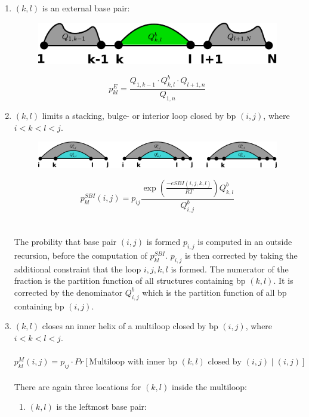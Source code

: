 \documentclass[11pt,a4paper]{report}
\begin{document}
\begin{enumerate}
\item $(k, l)$ is an external base pair:
\begin{figure}[H]
\centering
\includegraphics[scale=1]{BPP1.pdf}
\end{figure}
\begin{equation*}
p_{kl}^E = \frac{Q_{1,k-1} \cdot Q_{k,l}^b \cdot Q_{l+1,n}}{Q_{1,n}}
\end{equation*}
\item $(k, l)$ limits a stacking, bulge- or interior loop closed by bp $(i,j)$, where $i < k < l < j$.
\begin{figure}[H]
\centering
\includegraphics[scale=0.6]{BPP2.pdf}
\end{figure}
\begin{equation*}
p_{kl}^{SBI} (i,j) = p_{ij} \frac{\exp(\frac{-eSBI(i,j,k,l)}{RT}) Q_{k,l}^b}{Q_{i,j}^b}
\end{equation*}\\\\
The probility that base pair $(i,j)$ is formed $p_{i,j}$ is computed in an outside recursion, before the computation of $p_{kl}^{SBI}$. $p_{i,j}$ is then corrected by taking the additional constraint that the loop $i,j,k,l$ is formed. The numerator of the fraction is the partition function of all structures containing bp $(k,l)$. It is corrected by the denominator $Q_{i,j}^b$ which is the partition function of all bp containing bp $(i,j)$. \\
\item $(k, l)$ closes an inner helix of a multiloop closed by bp $(i,j)$, where $i < k < l < j$.\\\\
$p_{kl}^M (i,j) = p_{ij} \cdot Pr[\text{Multiloop with inner bp } (k,l) \text{ closed by } (i,j) \mid (i,j)]$\\\\
There are again three locations for $(k,l)$ inside the multiloop:
\begin{enumerate}
\item $(k,l)$ is the leftmost base pair:

\end{enumerate}
\end{enumerate}
\end{document}
